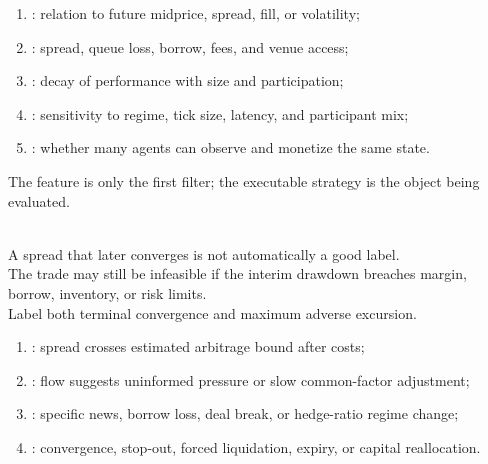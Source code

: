 \documentclass[a4paper,oneside,openany]{book}
\begin{document}
\begin{taxonomy} 
\begin{enumerate}[label=\roman*.]
\setlength{\itemsep}{0pt}
\item {}: relation to future midprice, spread, fill, or volatility;
\item {}: spread, queue loss, borrow, fees, and venue access;
\item {}: decay of performance with size and participation;
\item {}: sensitivity to regime, tick size, latency, and participant mix;
\item {}: whether many agents can observe and monetize the same state.
\end{enumerate}
The feature is only the first filter; the executable strategy is the object being evaluated.
\end{taxonomy}

\begin{principle} \\
A spread that later converges is not automatically a good label.\\
The trade may still be infeasible if the interim drawdown breaches margin, borrow, inventory, or risk limits.\\
Label both terminal convergence and maximum adverse excursion.
\end{principle}

\begin{taxonomy} 
\begin{enumerate}[label=\roman*.]
\setlength{\itemsep}{0pt}
\item {}: spread crosses estimated arbitrage bound after costs;
\item {}: flow suggests uninformed pressure or slow common-factor adjustment;
\item {}: specific news, borrow loss, deal break, or hedge-ratio regime change;
\item {}: convergence, stop-out, forced liquidation, expiry, or capital reallocation.
\end{enumerate}
\end{taxonomy}
\end{document}
